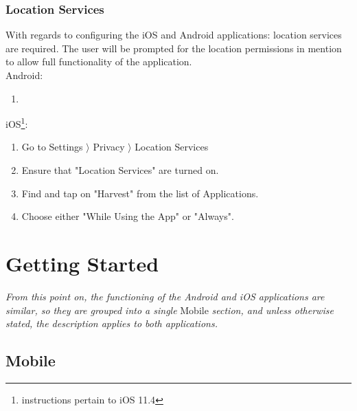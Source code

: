 \documentclass[11pt]{article}
\begin{document}
\subsubsection{Location Services}
With regards to configuring the iOS and Android applications: location services are required. The user will be prompted for the location permissions in mention to allow full functionality of the application.\\
Android:
\begin{enumerate}
 \item {}
\end{enumerate}
iOS\footnote{instructions pertain to iOS 11.4}:
\begin{enumerate}
 \item Go to Settings $\rangle$ Privacy $\rangle$ Location Services
 \item Ensure that "Location Services" are turned on.
 \item Find and tap on "Harvest" from the list of Applications.
 \item Choose either "While Using the App" or "Always".
\end{enumerate}

\newpage
\section{Getting Started}
\textit{From this point on, the functioning of the Android and iOS applications are similar, so they are grouped into a single} Mobile \textit{section, and unless otherwise stated, the description applies to both applications.}

\subsection{Mobile}
\end{document}
